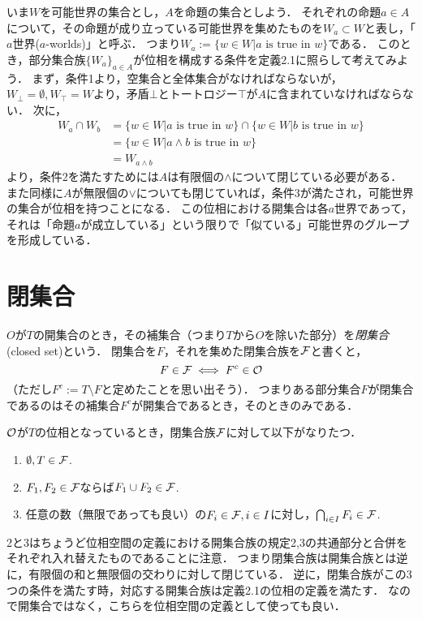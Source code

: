 \documentclass[11pt,a4paper]{jsarticle}
\begin{document}
\begin{example}
\label{possibleworlds}
いま$W$を可能世界の集合とし，$A$を命題の集合としよう．
それぞれの命題$a \in A$について，その命題が成り立っている可能世界を集めたものを$W_a \subset W$と表し，「$a$世界($a$-worlds)」と呼ぶ．
つまり$W_a := \{ w \in W | a \text{ is true in } w \}$である．
このとき，部分集合族$\{ W_a \}_{a \in A}$が位相を構成する条件を定義2.1に照らして考えてみよう．
まず，条件1より，空集合と全体集合がなければならないが，$W_{\bot} = \emptyset, W_{\top}=W$より，矛盾$\bot$とトートロジー$\top$が$A$に含まれていなければならない．
次に，
\begin{align*}
W_a \cap W_b &=  \{ w \in W | a \text{ is true in } w \} \cap \{ w \in W | b \text{ is true in } w \} \\
&= \{ w \in W | a \wedge b \text{ is true in } w \} \\
&= W_{a \wedge b}
\end{align*}
より，条件2を満たすためには$A$は有限個の$\wedge$について閉じている必要がある．
また同様に$A$が無限個の$\vee$についても閉じていれば，条件3が満たされ，可能世界の集合が位相を持つことになる．
この位相における開集合は各$a$世界であって，それは「命題$a$が成立している」という限りで「似ている」可能世界のグループを形成している．
\end{example}


\section{閉集合}
$O$が$T$の開集合のとき，その補集合（つまり$T$から$O$を除いた部分）を\emph{閉集合}(closed set)という．
閉集合を$F$，それを集めた閉集合族を$\mathcal{F}$と書くと，
\[
 F \in \mathcal{F} \iff F^c \in \mathcal{O}
\]
（ただし$F^c := T \setminus F$と定めたことを思い出そう）．
つまりある部分集合$F$が閉集合であるのはその補集合$F^c$が開集合であるとき，そのときのみである．

$\mathcal{O}$が$T$の位相となっているとき，閉集合族$\mathcal{F}$に対して以下がなりたつ．
\begin{enumerate}
 \item $\emptyset, T \in \mathcal{F}$.
 \item $F_1, F_2 \in \mathcal{F}$ならば$F_1 \cup F_2 \in \mathcal{F}$.
 \item 任意の数（無限であっても良い）の$F_i \in \mathcal{F}, i \in I$に対し，$\bigcap_{i \in I} F_i \in \mathcal{F}$.
\end{enumerate}
2と3はちょうど位相空間の定義における開集合族の規定2,3の共通部分と合併をそれぞれ入れ替えたものであることに注意．
つまり閉集合族は開集合族とは逆に，有限個の和と無限個の交わりに対して閉じている．
逆に，閉集合族がこの3つの条件を満たす時，対応する開集合族は定義2.1の位相の定義を満たす．
なので開集合ではなく，こちらを位相空間の定義として使っても良い．
\end{document}
